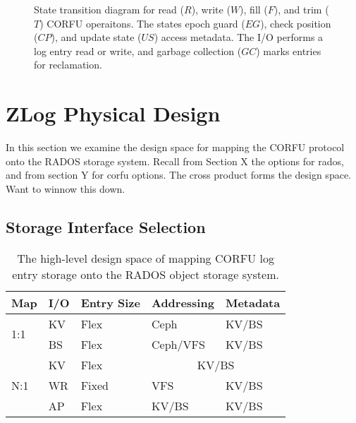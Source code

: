 \documentclass[10pt,twocolumn]{article}
\begin{document}
\begin{figure}
\centering
{}
\caption{State transition diagram for read ($R$), write ($W$), fill ($F$), and
trim ($T$) CORFU operaitons. The states epoch guard ($EG$), check position ($CP$),
and update state ($US$) access metadata. The I/O performs a log entry read or
write, and garbage collection ($GC$) marks entries for reclamation.}
\end{figure}

\section{ZLog Physical Design}

In this section we examine the design space for mapping the CORFU protocol onto
the RADOS storage system. Recall from Section X the options for rados,
and from section Y for corfu options. The cross product forms the design space.
Want to winnow this down.

\subsection{Storage Interface Selection}

\begin{table}
\begin{tabular}{ | l | l | l | l | l |}
\hline
Map & I/O & Entry Size & Addressing & Metadata \\ \hline
\multirow{2}{*}{1:1} & KV  & Flex     & Ceph      & KV/BS \\ \cline{2-5}
                     & BS  & Flex     & Ceph/VFS  & KV/BS \\ \hline
\multirow{4}{*}{N:1} & KV  & Flex     & \multicolumn{2}{|c|}{KV/BS} \\ \cline{2-5}
                     & WR  & Fixed    & VFS       & KV/BS \\ \cline{2-5}
                     & AP  & Flex     & KV/BS     & KV/BS \\
\hline
\end{tabular}
\caption{The high-level design space of mapping CORFU log entry storage onto
the RADOS object storage system.}
\label{t:init-ds}
\end{table}
\end{document}
